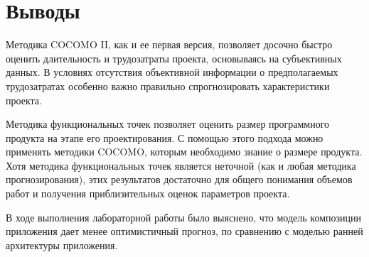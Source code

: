 \chapter{Выводы}

Методика COCOMO II, как и ее первая версия, позволяет досочно быстро оценить длительность и трудозатраты проекта, основываясь на субъективных данных. В условиях отсутствия объективной информации о предполагаемых трудозатратах особенно важно правильно спрогнозировать характеристики проекта. 

Методика функциональных точек позволяет оценить размер программного продукта на этапе его проектирования. С помощью этого подхода можно применять методики COCOMO, которым необходимо знание о размере продукта. Хотя методика функциональных точек является неточной (как и любая методика прогнозирования), этих результатов достаточно для общего понимания объемов работ и получения приблизительных оценок параметров проекта.

В ходе выполнения лабораторной работы было выяснено, что модель композиции приложения дает менее оптимистичный прогноз, по сравнению с моделью ранней архитектуры приложения.
